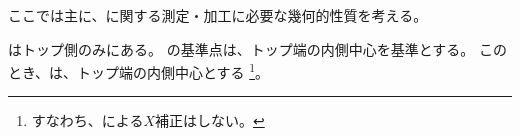 

ここでは主に、\textbf{\IncutBoring}に関する測定・加工に必要な幾何的性質を考える。



\IncutBoring はトップ側のみにある。
\IncutBoring の基準点は、トップ端の内側中心を基準とする。
このとき、\IncutBoringCenter は、トップ端の内側中心とする
\footnote{すなわち、\IncutBoringLength による$X$補正はしない。}。
